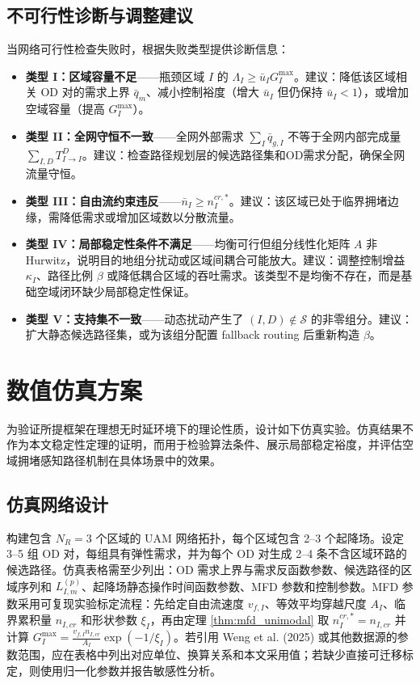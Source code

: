 \documentclass[a4paper,12pt]{article}
\theoremstyle{plain}
\theoremstyle{definition}
\theoremstyle{remark}
\begin{document}
\subsection{不可行性诊断与调整建议}

当网络可行性检查失败时，根据失败类型提供诊断信息：
\begin{itemize}
    \item \textbf{类型 I：区域容量不足}——瓶颈区域 $I$ 的 $\Lambda_I \ge \bar u_I G_I^{\max}$。建议：降低该区域相关 OD 对的需求上界 $\bar{q}_m$、减小控制裕度（增大 $\bar u_I$ 但仍保持 $\bar u_I<1$），或增加空域容量（提高 $G_I^{\max}$）。
    \item \textbf{类型 II：全网守恒不一致}——全网外部需求 $\sum_I \bar{q}_{g,I}$ 不等于全网内部完成量 $\sum_{I,D} T_{I \to I}^D$。建议：检查路径规划层的候选路径集和OD需求分配，确保全网流量守恒。
    \item \textbf{类型 III：自由流约束违反}——$\bar{n}_I \ge n_I^{cr,*}$。建议：该区域已处于临界拥堵边缘，需降低需求或增加区域数以分散流量。
    \item \textbf{类型 IV：局部稳定性条件不满足}——均衡可行但组分线性化矩阵 $A$ 非 Hurwitz，说明目的地组分扰动或区域间耦合可能放大。建议：调整控制增益 $\kappa_I$、路径比例 $\beta$ 或降低耦合区域的吞吐需求。该类型不是均衡不存在，而是基础空域闭环缺少局部稳定性保证。
    \item \textbf{类型 V：支持集不一致}——动态扰动产生了 $(I,D)\notin\mathcal S$ 的非零组分。建议：扩大静态候选路径集，或为该组分配置 fallback routing 后重新构造 $\beta$。
\end{itemize}

\section{数值仿真方案}

为验证所提框架在理想无时延环境下的理论性质，设计如下仿真实验。仿真结果不作为本文稳定性定理的证明，而用于检验算法条件、展示局部稳定裕度，并评估空域拥堵感知路径机制在具体场景中的效果。

\subsection{仿真网络设计}
构建包含 $N_R = 3$ 个区域的 UAM 网络拓扑，每个区域包含 2--3 个起降场。设定 3--5 组 OD 对，每组具有弹性需求，并为每个 OD 对生成 2--4 条不含区域环路的候选路径。仿真表格需至少列出：OD 需求上界与需求反函数参数、候选路径的区域序列和 $L_{I,m}^{(p)}$、起降场静态操作时间函数参数、MFD 参数和控制参数。MFD 参数采用可复现实验标定流程：先给定自由流速度 $v_{f,I}$、等效平均穿越尺度 $A_I$、临界累积量 $n_{I,cr}$ 和形状参数 $\xi_I$，再由定理 \ref{thm:mfd_unimodal} 取 $n_I^{cr,*}=n_{I,cr}$ 并计算 $G_I^{\max}=\frac{v_{f,I}n_{I,cr}}{A_I}\exp(-1/\xi_I)$。若引用 Weng et al. (2025) 或其他数据源的参数范围，应在表格中列出对应单位、换算关系和本文采用值；若缺少直接可迁移标定，则使用归一化参数并报告敏感性分析。
\end{document}

